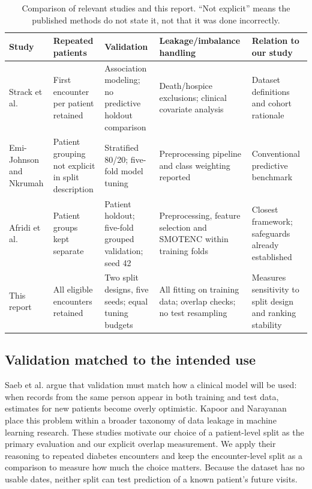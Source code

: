 \documentclass[conference]{IEEEtran}
\begin{document}
\begin{table}[t]
\caption{Comparison of relevant studies and this report. ``Not explicit'' means the published methods do not state it, not that it was done incorrectly.}
\label{tab:literature}\centering\small
\begin{tabular}{>{\raggedright\arraybackslash}p{2.25cm}>{\raggedright\arraybackslash}p{3.25cm}>{\raggedright\arraybackslash}p{3.65cm}>{\raggedright\arraybackslash}p{3.65cm}>{\raggedright\arraybackslash}p{2.65cm}}\toprule
Study & Repeated patients & Validation & Leakage/imbalance handling & Relation to our study\\\midrule
Strack et al. \cite{strack} & First encounter per patient retained & Association modeling; no predictive holdout comparison & Death/hospice exclusions; clinical covariate analysis & Dataset definitions and cohort rationale\\
Emi-Johnson and Nkrumah \cite{emi} & Patient grouping not explicit in split description & Stratified 80/20; five-fold model tuning & Preprocessing pipeline and class weighting reported & Conventional predictive benchmark\\
Afridi et al. \cite{afridi} & Patient groups kept separate & Patient holdout; five-fold grouped validation; seed 42 & Preprocessing, feature selection and SMOTENC within training folds & Closest framework; safeguards already established\\
This report & All eligible encounters retained & Two split designs, five seeds; equal tuning budgets & All fitting on training data; overlap checks; no test resampling & Measures sensitivity to split design and ranking stability\\\bottomrule
\end{tabular}
\end{table}

\subsection{Validation matched to the intended use}
Saeb et al. \cite{saeb} argue that validation must match how a clinical model will be used: when records from the same person appear in both training and test data, estimates for new patients become overly optimistic. Kapoor and Narayanan \cite{kapoor} place this problem within a broader taxonomy of data leakage in machine learning research. These studies motivate our choice of a patient-level split as the primary evaluation and our explicit overlap measurement. We apply their reasoning to repeated diabetes encounters and keep the encounter-level split as a comparison to measure how much the choice matters. Because the dataset has no usable dates, neither split can test prediction of a known patient's future visits.
\end{document}
